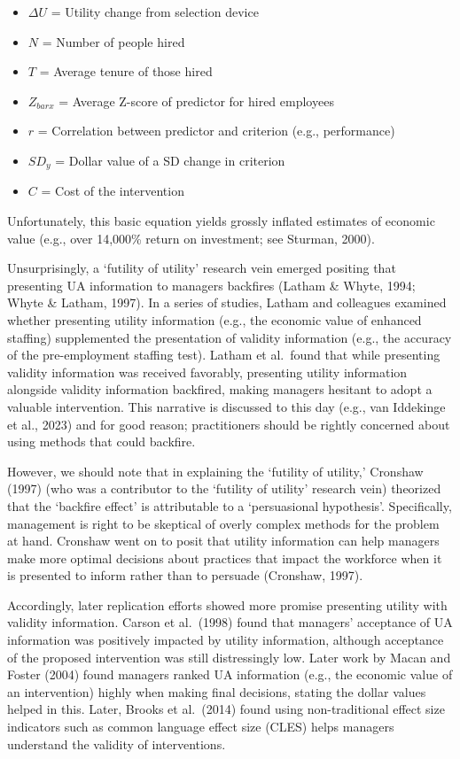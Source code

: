 \documentclass[
]{article}
\providecommand{\tightlist}{%
  \setlength{\itemsep}{0pt}\setlength{\parskip}{0pt}}
\begin{document}
\begin{itemize}
\tightlist
\item
  \(\Delta U\) = Utility change from selection device
\item
  \(N\) = Number of people hired
\item
  \(T\) = Average tenure of those hired
\item
  \(Z_{barx}\) = Average Z-score of predictor for hired employees
\item
  \(r\) = Correlation between predictor and criterion (e.g.,
  performance)
\item
  \(SD_y\) = Dollar value of a SD change in criterion
\item
  \(C\) = Cost of the intervention
\end{itemize}

Unfortunately, this basic equation yields grossly inflated estimates of
economic value (e.g., over 14,000\% return on investment; see Sturman,
2000).

Unsurprisingly, a `futility of utility' research vein emerged positing
that presenting UA information to managers backfires (Latham \& Whyte,
1994; Whyte \& Latham, 1997). In a series of studies, Latham and
colleagues examined whether presenting utility information (e.g., the
economic value of enhanced staffing) supplemented the presentation of
validity information (e.g., the accuracy of the pre-employment staffing
test). Latham et al.~found that while presenting validity information
was received favorably, presenting utility information alongside
validity information backfired, making managers hesitant to adopt a
valuable intervention. This narrative is discussed to this day (e.g.,
van Iddekinge et al., 2023) and for good reason; practitioners should be
rightly concerned about using methods that could backfire.

However, we should note that in explaining the `futility of utility,'
Cronshaw (1997) (who was a contributor to the `futility of utility'
research vein) theorized that the `backfire effect' is attributable to a
`persuasional hypothesis'. Specifically, management is right to be
skeptical of overly complex methods for the problem at hand. Cronshaw
went on to posit that utility information can help managers make more
optimal decisions about practices that impact the workforce when it is
presented to inform rather than to persuade (Cronshaw, 1997).

Accordingly, later replication efforts showed more promise presenting
utility with validity information. Carson et al.~(1998) found that
managers' acceptance of UA information was positively impacted by
utility information, although acceptance of the proposed intervention
was still distressingly low. Later work by Macan and Foster (2004) found
managers ranked UA information (e.g., the economic value of an
intervention) highly when making final decisions, stating the dollar
values helped in this. Later, Brooks et al.~(2014) found using
non-traditional effect size indicators such as common language effect
size (CLES) helps managers understand the validity of interventions.
\end{document}
